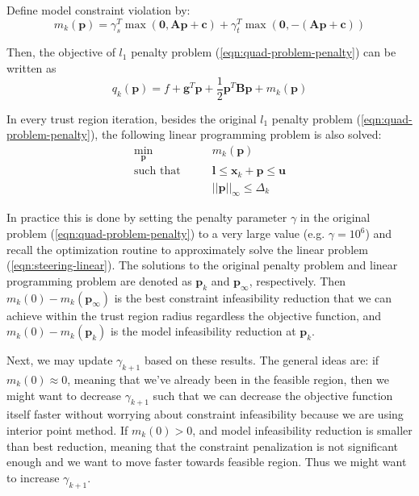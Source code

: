 \documentclass[12pt]{article}
\newcommand{\mb}{\mathbf}
\begin{document}
Define model constraint violation by:
\begin{equation}
    m_k(\mb{p}) = \gamma_s^T \max(\mb{0}, \mb{A}\mb{p} + \mb{c}) + \gamma_t^T \max(\mb{0}, -(\mb{A}\mb{p} + \mb{c}))
\end{equation}

Then, the objective of $l_1$ penalty problem (\ref{eqn:quad-problem-penalty}) can be written as
\begin{equation}
    q_k(\mb{p}) = f + \mb{g}^T\mb{p} + \frac{1}{2}\mb{p}^T\mb{B}\mb{p} + m_k(\mb{p})
\end{equation}

In every trust region iteration, besides the original $l_1$ penalty problem (\ref{eqn:quad-problem-penalty}), the following linear programming problem is also solved:
\begin{equation}
  \label{eqn:steering-linear}
  \begin{aligned}
    \min_{\mb{p}} \qquad & m_k(\mb{p})\\
    \text{such that} \qquad
    & \mb{l} \le \mb{x}_k + \mb{p} \le \mb{u} \\
    & ||\mb{p}||_\infty \le \Delta_k
  \end{aligned}
\end{equation}

In practice this is done by setting the penalty parameter $\gamma$ in the original problem (\ref{eqn:quad-problem-penalty}) to a very large value (e.g. $\gamma = 10^6$) and recall the optimization routine to approximately solve the linear problem (\ref{eqn:steering-linear}). The solutions to the original penalty problem and linear programming problem are denoted as $\mb{p}_k$ and $\mb{p}_\infty$, respectively. Then $m_k(0) - m_k(\mb{p}_\infty)$ is the best constraint infeasibility reduction that we can achieve within the trust region radius regardless the objective function, and $m_k(0) - m_k(\mb{p}_k)$ is the model infeasibility reduction at $\mb{p}_k$.

Next, we may update $\gamma_{k+1}$ based on these results. The general ideas are: if $m_k(0) \approx 0$, meaning that we've already been in the feasible region, then we might want to decrease $\gamma_{k+1}$ such that we can decrease the objective function itself faster without worrying about constraint infeasibility because we are using interior point method. If $m_k(0) > 0$, and model infeasibility reduction is smaller than best reduction, meaning that the constraint penalization is not significant enough and we want to move faster towards feasible region. Thus we might want to increase $\gamma_{k+1}$.
\end{document}
